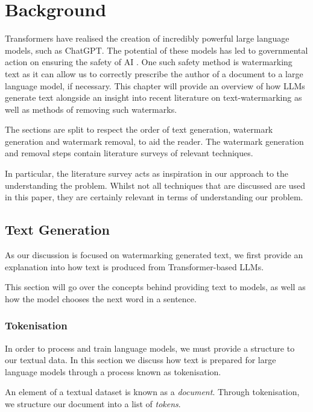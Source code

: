 \documentclass{l4proj}
\theoremstyle{definition}
\begin{document}
    
\chapter{Background}
Transformers have realised the creation of incredibly powerful large language models, such as ChatGPT. The potential of these models has led to governmental action on ensuring the safety of AI \citep{whitehouse2023ai}. One such safety method is watermarking text as it can allow us to correctly prescribe the author of a document to a large language model, if necessary. This chapter will provide an overview of how LLMs generate text alongside an insight into recent literature on text-watermarking as well as methods of removing such watermarks. 

The sections are split to respect the order of text generation, watermark generation and watermark removal, to aid the reader. The watermark generation and removal steps contain literature surveys of relevant techniques. 

In particular, the literature survey acts as inspiration in our approach to the understanding the problem. Whilst not all techniques that are discussed are used in this paper, they are certainly relevant in terms of understanding our problem.

\section{Text Generation}
    As our discussion is focused on watermarking generated text, we first provide an explanation into how text is produced from Transformer-based LLMs.

    This section will go over the concepts behind providing text to models, as well as how the model chooses the next word in a sentence.
    
    \subsection{Tokenisation}
        \label{sec:tokenisation}
        In order to process and train language models, we must provide a structure to our textual data. In this section we discuss how text is prepared for large language models through a process known as tokenisation.
        
        An element of a textual dataset is known as a \emph{document}. Through tokenisation, we structure our document into a list of \emph{tokens}.
\end{document}
